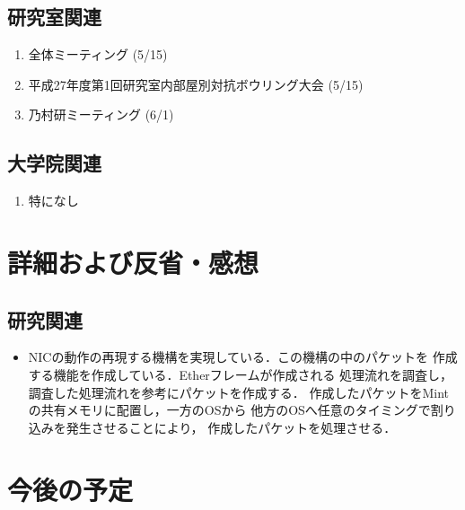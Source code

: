 \documentclass[fleqn, 14pt]{extarticle}
\begin{document}
\subsection{研究室関連}
\label{sec-2-2}
\begin{enumerate}

\item 全体ミーティング 
\hfill
\label{enum-lab1}
(5/15)


\item 平成27年度第1回研究室内部屋別対抗ボウリング大会
\hfill
\label{enum-lab2}
(5/15)

\item 乃村研ミーティング
\hfill
\label{enum-lab2}
(6/1)

\end{enumerate}

\subsection{大学院関連}
\label{sec2-3}
\begin{enumerate}

    \item 特になし
    \hfill
    \label{enum-univ2}

\end{enumerate}

\section{詳細および反省・感想}
\label{sec-3}
\subsection{研究関連}
\label{sec-3-2}
\begin{itemize}
\item[(\ref{enum-1-D})]
    NICの動作の再現する機構を実現している．この機構の中のパケットを
    作成する機能を作成している．Etherフレームが作成される
    処理流れを調査し，調査した処理流れを参考にパケットを作成する．
    作成したパケットをMintの共有メモリに配置し，一方のOSから
    他方のOSへ任意のタイミングで割り込みを発生させることにより，
    作成したパケットを処理させる．

\end{itemize}

\section{今後の予定}
\label{sec-4}
\end{document}
